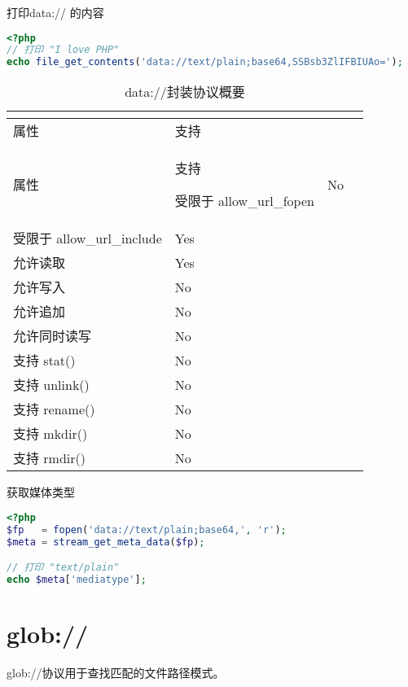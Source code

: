 \begin{example}
打印data:// 的内容
\begin{lstlisting}[language=PHP]
<?php
// 打印 "I love PHP"
echo file_get_contents('data://text/plain;base64,SSBsb3ZlIFBIUAo=');
\end{lstlisting}
\end{example}


\begin{longtable}{|m{100pt}|m{150pt}|}
\tabularnewline\hline
属性&支持
\endhead

\caption{data://封装协议概要}\\
\hline
属性&支持
\endfirsthead

\endfoot

\endlastfoot
\hline
受限于 allow\_url\_fopen&No\\
\hline
受限于 allow\_url\_include&Yes\\
\hline
允许读取	&Yes\\
\hline
允许写入	&No\\
\hline
允许追加	&No\\
\hline
允许同时读写&No\\
\hline
支持 stat()	&No\\
\hline
支持 unlink()	&No\\
\hline
支持 rename()	&No\\
\hline
支持 mkdir()	&No\\
\hline
支持 rmdir()	&No\\
\hline
\end{longtable}




\begin{example}
获取媒体类型
\begin{lstlisting}[language=PHP]
<?php
$fp   = fopen('data://text/plain;base64,', 'r');
$meta = stream_get_meta_data($fp);

// 打印 "text/plain"
echo $meta['mediatype'];
\end{lstlisting}
\end{example}

\section{glob://}

glob://协议用于查找匹配的文件路径模式。



